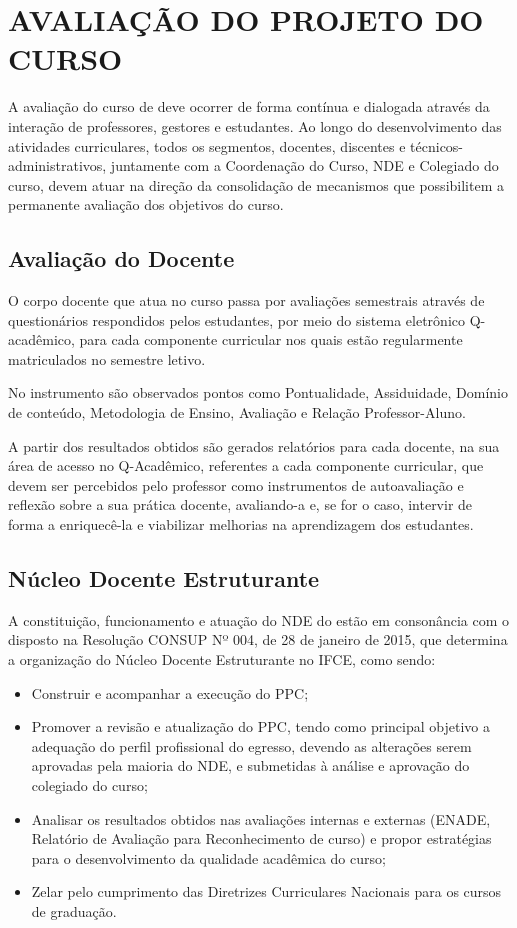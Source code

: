 \section{AVALIAÇÃO DO PROJETO DO CURSO}

A avaliação do curso de \NOMECURSO deve ocorrer de forma contínua e dialogada através da interação de professores, gestores e estudantes. Ao longo do desenvolvimento das atividades curriculares, todos os segmentos, docentes, discentes e técnicos-administrativos, juntamente com a Coordenação do Curso, NDE e Colegiado do curso, devem atuar na direção da consolidação de mecanismos que possibilitem a permanente avaliação dos objetivos do curso.

\subsection{Avaliação do Docente}

O corpo docente que atua no curso passa por avaliações semestrais através de questionários respondidos pelos estudantes, por meio do sistema eletrônico Q-acadêmico, para cada componente curricular nos quais estão regularmente matriculados no semestre letivo. 

No instrumento são observados pontos como Pontualidade, Assiduidade, Domínio de conteúdo, Metodologia de Ensino, Avaliação e Relação Professor-Aluno.

A partir dos resultados obtidos são gerados relatórios para cada docente, na sua área de acesso no Q-Acadêmico, referentes a cada componente curricular, que devem ser percebidos pelo professor como instrumentos de autoavaliação e reflexão sobre a sua prática docente, avaliando-a e, se for o caso, intervir de forma a enriquecê-la e viabilizar melhorias na aprendizagem dos estudantes.


\subsection{Núcleo Docente Estruturante}


A constituição, funcionamento e atuação do NDE do \NOMECURSO estão em consonância com o disposto na Resolução CONSUP Nº 004, de 28 de janeiro de 2015, que determina a organização do Núcleo Docente Estruturante no IFCE, como sendo:
\begin{itemize}
	\item Construir e acompanhar a execução do PPC;
	\item Promover a revisão e atualização do PPC, tendo como principal objetivo a adequação do perfil profissional do egresso, devendo as alterações serem aprovadas pela maioria do NDE, e submetidas à análise e aprovação do colegiado do curso;
	\item Analisar os resultados obtidos nas avaliações internas e externas (ENADE, Relatório de Avaliação para Reconhecimento de curso) e propor estratégias para o desenvolvimento da qualidade acadêmica do curso;
	\item Zelar pelo cumprimento das Diretrizes Curriculares Nacionais para os cursos de graduação.
\end{itemize}

